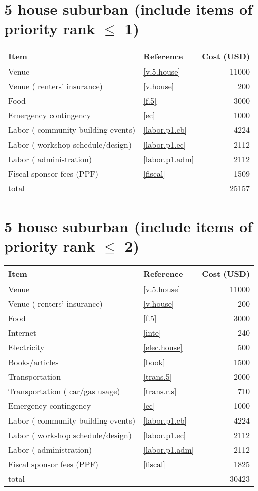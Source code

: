 \section*{5 house suburban (include items of priority rank $\leq$ 1)}
\begin{center}
\begin{tabular}{llr}
Item & Reference & Cost (USD) \\ \hline
Venue & \ref{v.5.house} & 11000 \\
Venue ( renters' insurance) & \ref{v.house} & 200 \\
Food & \ref{f.5} & 3000 \\
Emergency contingency & \ref{ec} & 1000 \\
Labor ( community-building events) & \ref{labor.p1.cb} & 4224 \\
Labor ( workshop schedule/design) & \ref{labor.p1.ec} & 2112 \\
Labor ( administration) & \ref{labor.p1.adm} & 2112 \\
Fiscal sponsor fees (PPF) & \ref{fiscal} & 1509 \\ \hline
total &  & 25157
\end{tabular}
\end{center}
\newpage
\section*{5 house suburban (include items of priority rank $\leq$ 2)}
\begin{center}
\begin{tabular}{llr}
Item & Reference & Cost (USD) \\ \hline
Venue & \ref{v.5.house} & 11000 \\
Venue ( renters' insurance) & \ref{v.house} & 200 \\
Food & \ref{f.5} & 3000 \\
Internet & \ref{inte} & 240 \\
Electricity & \ref{elec.house} & 500 \\
Books/articles & \ref{book} & 1500 \\
Transportation & \ref{trans.5} & 2000 \\
Transportation ( car/gas usage) & \ref{trans.r.s} & 710 \\
Emergency contingency & \ref{ec} & 1000 \\
Labor ( community-building events) & \ref{labor.p1.cb} & 4224 \\
Labor ( workshop schedule/design) & \ref{labor.p1.ec} & 2112 \\
Labor ( administration) & \ref{labor.p1.adm} & 2112 \\
Fiscal sponsor fees (PPF) & \ref{fiscal} & 1825 \\ \hline
total &  & 30423
\end{tabular}
\end{center}
\newpage
